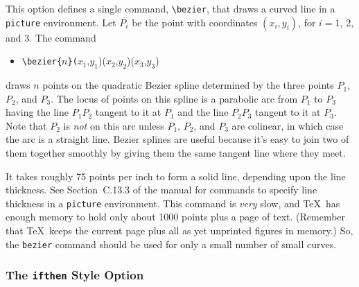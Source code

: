 This option defines a single command, \hbox{\verb|\bezier|}, that draws
a curved line in a {\tt picture} environment.  Let $P_{i}$ be the point
with coordinates $(x_{i},y_{i})$, for $i=1$, 2, and 3.  The command
\begin{itemize} \tt
\item[]
\verb|\bezier{|$n$\verb|}(|$x_{1}$,$y_{1}$)($x_{2}$,$y_{2}$)($x_{3}$,$y_{3}$)
\end{itemize}
draws $n$ points on the quadratic Bezier spline determined by the three
points $P_{1}$, $P_{2}$, and $P_{3}$.  The locus of points on this
spline is a parabolic arc from $P_{1}$ to $P_{3}$ having the line
$P_{1}P_{2}$ tangent to it at $P_{1}$ and the line $P_{2}P_{3}$ tangent
to it at $P_{3}$.  Note that $P_{2}$ is {\em not\/} on this arc unless
$P_{1}$, $P_{2}$, and $P_{3}$ are colinear, in which case the arc is a
straight line.  Bezier splines are useful because it's easy to join two
of them together smoothly by giving them the same tangent line where
they meet.
 
It takes roughly 75 points per inch to form a solid line, depending
upon the line thickness.  See Section~C.13.3 of the manual for commands
to specify line thickness in a {\tt picture} environment.  This command
is {\em very\/} slow, and \TeX\ has enough memory to hold only about
1000 points plus a page of text.  (Remember that \TeX\ keeps the
current page plus all as yet unprinted figures in memory.) So, the
\verb|bezier| command should be used for only a small number of small
curves.
 
 
\subsubsection{The {\tt ifthen} Style Option}
 
